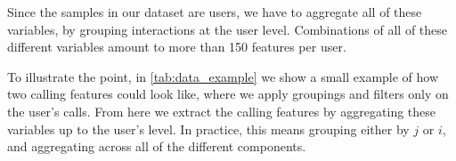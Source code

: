 



Since the samples in our dataset are users, we have to aggregate all of these variables, by grouping interactions at the user level.
Combinations of all of these different variables amount to more than 150 features per user.

To illustrate the point, in \cref{tab:data_example} we show a small example of how two calling features could look like, where we apply groupings and filters only on the user's calls.
From here we extract the calling features by aggregating these variables up to the user's level.
In practice, this means grouping either by $j$ or $i$, and aggregating across all of the different components.


